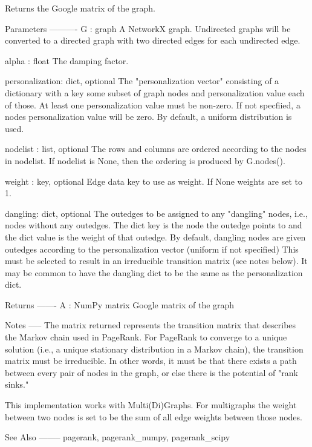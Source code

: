 \begin{DoxyVerb}Returns the Google matrix of the graph.

Parameters
----------
G : graph
  A NetworkX graph.  Undirected graphs will be converted to a directed
  graph with two directed edges for each undirected edge.

alpha : float
  The damping factor.

personalization: dict, optional
  The "personalization vector" consisting of a dictionary with a
  key some subset of graph nodes and personalization value each of those.
  At least one personalization value must be non-zero.
  If not specfiied, a nodes personalization value will be zero.
  By default, a uniform distribution is used.

nodelist : list, optional
  The rows and columns are ordered according to the nodes in nodelist.
  If nodelist is None, then the ordering is produced by G.nodes().

weight : key, optional
  Edge data key to use as weight.  If None weights are set to 1.

dangling: dict, optional
  The outedges to be assigned to any "dangling" nodes, i.e., nodes without
  any outedges. The dict key is the node the outedge points to and the dict
  value is the weight of that outedge. By default, dangling nodes are given
  outedges according to the personalization vector (uniform if not
  specified) This must be selected to result in an irreducible transition
  matrix (see notes below). It may be common to have the dangling dict to
  be the same as the personalization dict.

Returns
-------
A : NumPy matrix
   Google matrix of the graph

Notes
-----
The matrix returned represents the transition matrix that describes the
Markov chain used in PageRank. For PageRank to converge to a unique
solution (i.e., a unique stationary distribution in a Markov chain), the
transition matrix must be irreducible. In other words, it must be that
there exists a path between every pair of nodes in the graph, or else there
is the potential of "rank sinks."

This implementation works with Multi(Di)Graphs. For multigraphs the
weight between two nodes is set to be the sum of all edge weights
between those nodes.

See Also
--------
pagerank, pagerank_numpy, pagerank_scipy
\end{DoxyVerb}
 \mbox{\label{namespacenetworkx_1_1algorithms_1_1link__analysis_1_1pagerank__alg_a348f8656b33900f6fc8b02b4086a691d}} 
